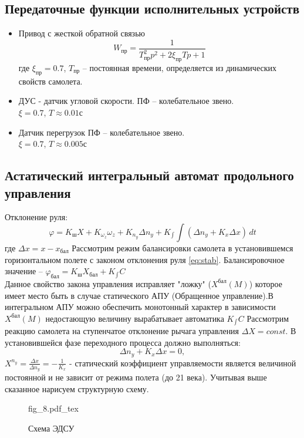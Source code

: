 \documentclass{article}
\begin{document}
\subsection{Передаточные функции исполнительных устройств}
\begin{itemize}
    \item Привод с жесткой обратной связью
          \[
              W_\text{пр} = \frac{1}{T_\text{пр}^2p^2 + 2 \xi_\text{пр} Tp + 1}
          \]
          где $\xi_\text{пр} = 0.7$, $T_\text{пр}$ -- постоянная времени,
          определяется из динамических свойств самолета.

    \item ДУС - датчик угловой скорости.
          ПФ -- колебательное звено.\\
          $\xi = 0.7$, $T \approx 0.01 \text{с}$

    \item Датчик перегрузок
          ПФ -- колебательное звено.\\
          $\xi = 0.7$, $T \approx 0.005 \text{с}$
\end{itemize}

\subsection{Астатический интегральный автомат продольного управления}
Отклонение руля:
\begin{equation}
    \varphi = K_\text{ш} X + K_{\omega_z} \omega_z + K_{n_y} \Delta n_y +
    K_{\int} \int (\Delta n_y + K_x \Delta x) \, dt
    \label{eq:stab}
\end{equation}
где $\Delta x = x - x_\text{бал}$
Рассмотрим режим балансировки самолета в установившемся горизонтальном полете с
законом отклонения руля \eqref{eq:stab}.
Балансировочное значение -- $\varphi_\text{бал} = K_\text{ш} X_\text{бал} +
K_{\int} C$\\
Данное свойство закона управления исправляет "ложку" ($X^\text{бал}(M)$) которое 
имеет место быть в случае статического АПУ (Обращенное управление).В
интегральном АПУ можно обеспечить монотонный характер в зависимости
$X^\text{бал} (M)$ недостающую величину вырабатывает автоматика $K_{\int}C$
Рассмотрим реакцию самолета на ступенчатое отклонение рычага управления $\Delta
X = const$. В установившейся фазе переходного процесса должно выполняться:
\[
    \Delta n_y + K_x \Delta x = 0,
\]
$ X^{n_y} = \frac{\Delta x}{\Delta n_y} = -\frac{1}{K_x} $ - статический
коэффициент управляемости является величиной постоянной и не зависит от режима
полета (до 21 века).
Учитывая выше сказанное нарисуем структурную схему.
\begin{figure}[H]
    \begin{minipage}{\textwidth}
        \centering
        {fig_8.pdf_tex}
    \end{minipage}
    \caption{Схема ЭДСУ}
\end{figure}
\end{document}
